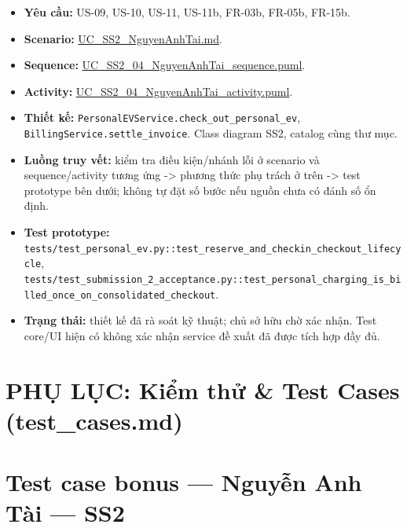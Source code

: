 \documentclass[11pt,a4paper]{article}
\providecommand{\tightlist}{%
  \setlength{\itemsep}{0pt}\setlength{\parskip}{0pt}}
\begin{document}
\begin{itemize}
\tightlist
\item
  \textbf{Yêu cầu:} US-09, US-10, US-11, US-11b, FR-03b, FR-05b, FR-15b.
\item
  \textbf{Scenario:}
  \href{../../../../docs/diagrams/Use-case\%20detail-scenario/SS2/Usecase\%20scenario/UC_SS2_NguyenAnhTai.md}{UC\_SS2\_NguyenAnhTai.md}.
\item
  \textbf{Sequence:}
  \href{../../../../docs/diagrams/Use-case\%20detail-scenario/SS2/Sequence\%20diagrams/UC_SS2_04_NguyenAnhTai_sequence.puml}{UC\_SS2\_04\_NguyenAnhTai\_sequence.puml}.
\item
  \textbf{Activity:}
  \href{../../../../docs/diagrams/Use-case\%20detail-scenario/SS2/Activity\%20diagrams/UC_SS2_04_NguyenAnhTai_activity.puml}{UC\_SS2\_04\_NguyenAnhTai\_activity.puml}.
\item
  \textbf{Thiết kế:}
  \texttt{PersonalEVService.check\_out\_personal\_ev},
  \texttt{BillingService.settle\_invoice}. Class diagram SS2, catalog
  cùng thư mục.
\item
  \textbf{Luồng truy vết:} kiểm tra điều kiện/nhánh lỗi ở scenario và
  sequence/activity tương ứng -\textgreater{} phương thức phụ trách ở
  trên -\textgreater{} test prototype bên dưới; không tự đặt số bước nếu
  nguồn chưa có đánh số ổn định.
\item
  \textbf{Test prototype:}
  \texttt{tests/test\_personal\_ev.py::test\_reserve\_and\_checkin\_checkout\_lifecycle},
  \texttt{tests/test\_submission\_2\_acceptance.py::test\_personal\_charging\_is\_billed\_once\_on\_consolidated\_checkout}.
\item
  \textbf{Trạng thái:} thiết kế đã rà soát kỹ thuật; chủ sở hữu chờ xác
  nhận. Test core/UI hiện có không xác nhận service đề xuất đã được tích
  hợp đầy đủ.
\end{itemize}

\newpage
\section*{PHỤ LỤC: Kiểm thử \& Test Cases (test\_cases.md)}
\hypertarget{test-case-bonus-nguyux1ec5n-anh-tuxe0i-ss2}{%
\section{Test case bonus --- Nguyễn Anh Tài ---
SS2}\label{test-case-bonus-nguyux1ec5n-anh-tuxe0i-ss2}}
\end{document}
